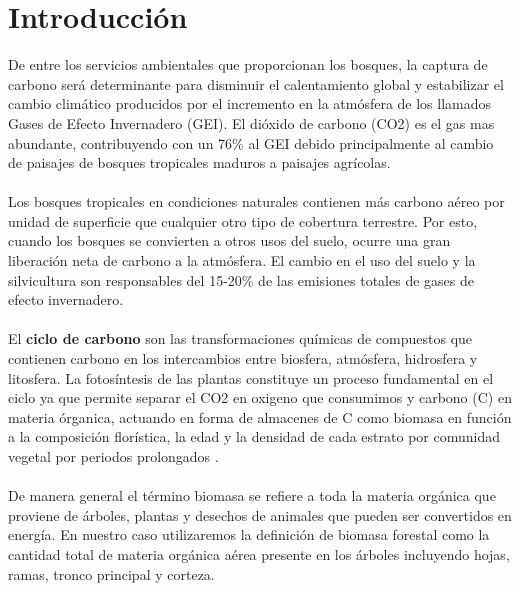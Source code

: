 \newpage{\ } 
\thispagestyle{empty} 

\chapter{Introducción}


De entre los servicios ambientales que proporcionan los bosques, la captura de carbono ser\'a determinante para disminuir el calentamiento global y estabilizar el cambio clim\'atico producidos por el incremento en la atmósfera de los llamados Gases de Efecto Invernadero (GEI). El di\'oxido de carbono (CO2) es el gas mas abundante, contribuyendo con un 76\% al GEI \cite{avila2001almacenamiento} debido principalmente al cambio de paisajes de bosques tropicales maduros a paisajes agr\'icolas.\\~\\
Los bosques tropicales en condiciones naturales contienen m\'as carbono a\'ereo por unidad de superficie que cualquier otro tipo de cobertura terrestre. Por esto, cuando los bosques se convierten a otros usos del suelo, ocurre una gran liberaci\'on neta de carbono a la atm\'osfera. El cambio en el uso del suelo y la silvicultura son responsables del 15-20\% de las emisiones totales de gases de efecto invernadero\cite{peralta2013analisis}.\\~\\
El \textbf{ciclo de carbono} son las transformaciones qu\'imicas de compuestos que contienen carbono en los intercambios entre biosfera, atm\'osfera, hidrosfera y litosfera. La fotosíntesis de las plantas constituye un proceso fundamental en el ciclo ya que permite separar  el CO2 en oxigeno que consumimos y carbono (C) en materia \'organica, actuando en forma de almacenes de C como biomasa en función a la composición flor\'istica, la edad y la densidad de cada estrato por comunidad vegetal por periodos prolongados \cite{acosta2003diseno}.\\~\\
De manera general el t\'ermino biomasa se refiere a toda la materia org\'anica que proviene de \'arboles, plantas y desechos de animales que pueden ser convertidos en energ\'ia. En nuestro caso utilizaremos la definici\'on de biomasa forestal como la cantidad total de materia org\'anica a\'erea presente en los \'arboles incluyendo hojas, ramas, tronco principal y corteza\cite{garzuglia2003wood}.\\~\\
